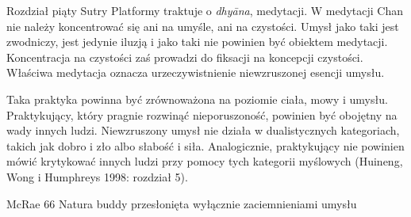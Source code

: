 Rozdział piąty Sutry Platformy traktuje o \textit{dhyāna}, medytacji. W medytacji Chan nie należy koncentrować się ani na umyśle, ani na czystości. Umysł jako taki jest zwodniczy, jest jedynie iluzją i jako taki nie powinien być obiektem medytacji. Koncentracja na czystości zaś prowadzi do fiksacji na koncepcji czystości. Właściwa medytacja oznacza urzeczywistnienie niewzruszonej esencji umysłu.

Taka praktyka powinna być zrównoważona na poziomie ciała, mowy i umysłu. Praktykujący, który pragnie rozwinąć nieporuszoność, powinien być obojętny na wady innych ludzi. Niewzruszony umysł nie działa w dualistycznych kategoriach, takich jak dobro i zło albo słabość i siła. Analogicznie, praktykujący nie powinien mówić krytykować innych ludzi przy pomocy tych kategorii myślowych (Huineng, Wong i Humphreys 1998: rozdział 5).

McRae 66
Natura buddy przesłonięta wyłącznie zaciemnieniami umysłu
\fi
